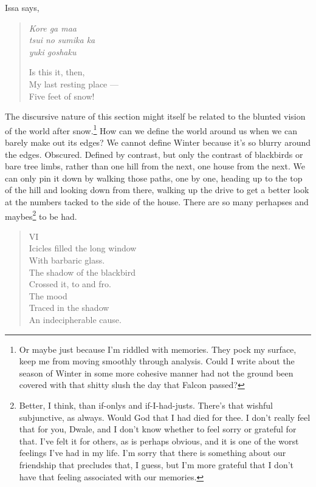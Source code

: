 \documentclass[12pt,oneside]{memoir}
\begin{document}
Issa says,

\begin{verse}
\begin{multicols}{2}
\emph{Kore ga maa} \\
\emph{tsui no sumika ka} \\
\emph{yuki goshaku}

\columnbreak

Is this it, then, \\
My last resting place --- \\
Five feet of snow!
\end{multicols}
\parencite[37]{issa}
\end{verse}

The discursive nature of this section might itself be related to the blunted vision of the world after snow.\footnote{Or maybe just because I'm riddled with memories. They pock my surface, keep me from moving smoothly through analysis. Could I write about the season of Winter in some more cohesive manner had not the ground been covered with that shitty slush the day that Falcon passed?} How can we define the world around us when we can barely make out its edges? We cannot define Winter because it's so blurry around the edges. Obscured. Defined by contrast, but only the contrast of blackbirds or bare tree limbs, rather than one hill from the next, one house from the next. We can only pin it down by walking those paths, one by one, heading up to the top of the hill and looking down from there, walking up the drive to get a better look at the numbers tacked to the side of the house. There are so many perhapses and maybes\footnote{Better, I think, than if-onlys and if-I-had-justs. There's that wishful subjunctive, as always. Would God that I had died for thee. I don't really feel that for you, Dwale, and I don't know whether to feel sorry or grateful for that. I've felt it for others, as is perhaps obvious, and it is one of the worst feelings I've had in my life. I'm sorry that there is something about our friendship that precludes that, I guess, but I'm more grateful that I don't have that feeling associated with our memories.} to be had.

\begin{verse}

VI \\
Icicles filled the long window \\
With barbaric glass. \\
The shadow of the blackbird \\
Crossed it, to and fro. \\
The mood \\
Traced in the shadow \\
An indecipherable cause.

\parencite{blackbird}
\end{verse}
\end{document}
